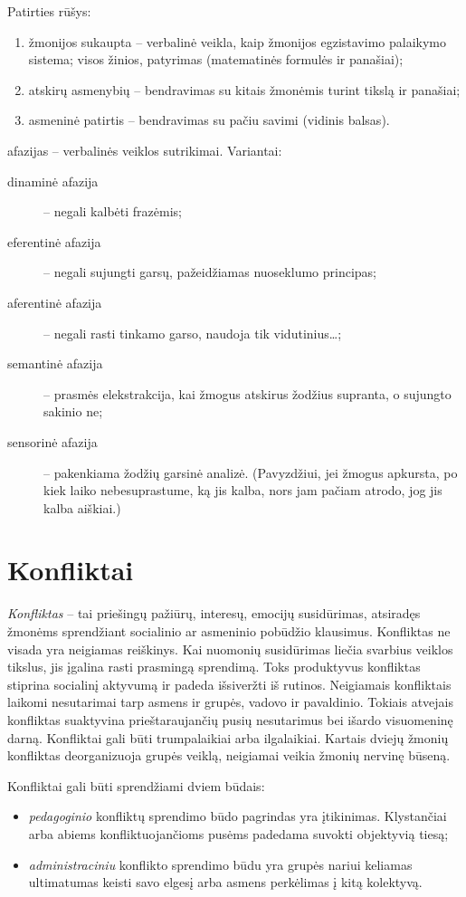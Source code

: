 Patirties rūšys:
\begin{enumerate}
  \item žmonijos sukaupta – verbalinė veikla, kaip žmonijos egzistavimo 
    palaikymo sistema; visos žinios, patyrimas (matematinės formulės
    ir panašiai);
  \item atskirų asmenybių – bendravimas su kitais žmonėmis turint tikslą
    ir panašiai;
  \item asmeninė patirtis – bendravimas su pačiu savimi (vidinis balsas).
\end{enumerate}

\Glspl{afazija} – verbalinės veiklos sutrikimai. Variantai:
\begin{description}
  \item[dinaminė afazija] – negali kalbėti frazėmis;
  \item[eferentinė afazija] – negali sujungti garsų, pažeidžiamas nuoseklumo
    principas;
  \item[aferentinė afazija] – negali rasti tinkamo garso, naudoja tik
    vidutinius…; %
  \item[semantinė afazija]  – prasmės elekstrakcija, 
    kai žmogus atskirus žodžius supranta, o sujungto sakinio ne;
  \item[sensorinė afazija] – pakenkiama žodžių garsinė analizė. (Pavyzdžiui,
    jei žmogus apkursta, po kiek laiko nebesuprastume, ką jis kalba, nors
    jam pačiam atrodo, jog jis kalba aiškiai.)
\end{description}

\section{Konfliktai}

\label{tema:konfliktai}

\emph{Konfliktas} – tai priešingų pažiūrų, interesų, emocijų susidūrimas, 
atsiradęs žmonėms sprendžiant socialinio ar asmeninio pobūdžio klausimus.
Konfliktas ne visada yra neigiamas reiškinys. Kai nuomonių susidūrimas 
liečia svarbius veiklos tikslus, jis įgalina rasti prasmingą sprendimą. 
Toks produktyvus konfliktas stiprina socialinį aktyvumą ir padeda 
išsiveržti iš rutinos. Neigiamais konfliktais laikomi nesutarimai tarp 
asmens ir grupės, vadovo ir pavaldinio. Tokiais atvejais konfliktas 
suaktyvina prieštaraujančių pusių nesutarimus bei išardo visuomeninę darną. 
Konfliktai gali būti trumpalaikiai arba ilgalaikiai. Kartais dviejų žmonių 
konfliktas deorganizuoja grupės veiklą, neigiamai veikia žmonių nervinę 
būseną.

Konfliktai gali būti sprendžiami dviem būdais:
\begin{itemize}
  \item \emph{pedagoginio} konfliktų sprendimo būdo pagrindas yra 
    įtikinimas. Klystančiai arba abiems konfliktuojančioms pusėms padedama 
    suvokti objektyvią tiesą;
  \item \emph{administraciniu} konflikto sprendimo būdu yra grupės nariui 
    keliamas ultimatumas keisti savo elgesį arba asmens perkėlimas į kitą 
    kolektyvą.
\end{itemize}
